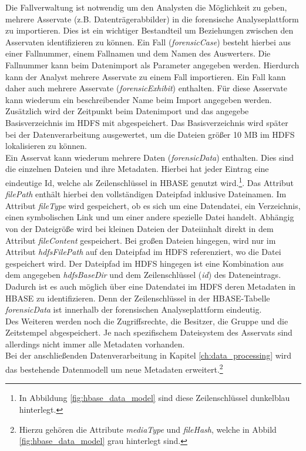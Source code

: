 \noindent
Die Fallverwaltung ist notwendig um den Analysten die Möglichkeit zu geben, mehrere Asservate (z.B. Datenträgerabbilder) in die forensische Analyseplattform zu importieren. Dies ist ein wichtiger Bestandteil um Beziehungen zwischen den Asservaten identifizieren zu können. Ein Fall (\textit{forensicCase}) besteht hierbei aus einer Fallnummer, einem Fallnamen und dem Namen des Auswerters. Die Fallnummer kann beim Datenimport als Parameter angegeben werden. Hierdurch kann der Analyst mehrere Asservate zu einem Fall importieren. Ein Fall kann daher auch mehrere Asservate (\textit{forensicExhibit}) enthalten. Für diese Asservate kann wiederum ein beschreibender Name beim Import angegeben werden. Zusätzlich wird der Zeitpunkt beim Datenimport und das angegebe Basisverzeichnis im HDFS mit abgespeichert. Das Basisverzeichnis wird später bei der Datenverarbeitung ausgewertet, um die Dateien größer 10 MB im HDFS lokalisieren zu können.\\

\noindent
Ein Asservat kann wiederum mehrere Daten (\textit{forensicData}) enthalten. Dies sind die einzelnen Dateien und ihre Metadaten. Hierbei hat jeder Eintrag eine eindeutige Id, welche als Zeilenschlüssel in HBASE genutzt wird.\footnote{In Abbildung \ref{fig:hbase_data_model} sind diese Zeilenschlüssel dunkelblau hinterlegt.}. Das Attribut \textit{filePath} enthält hierbei den vollständigen Dateipfad inklusive Dateinamen. 
Im Attribut \textit{fileType} wird gespeichert, ob es sich um eine Datendatei, ein Verzeichnis, einen symbolischen Link und um einer andere spezielle Datei handelt. Abhängig von der Dateigröße wird bei kleinen Dateien der Dateiinhalt direkt in dem Attribut \textit{fileContent} gespeichert. Bei großen Dateien hingegen, wird nur im Attribut \textit{hdfsFilePath} auf den Dateipfad im HDFS referenziert, wo die Datei gespeichert wird. Der Dateipfad im HDFS hingegen ist eine Kombination aus dem angegeben \textit{hdfsBaseDir} und dem Zeilenschlüssel (\textit{id}) des Dateneintrags. Dadurch ist es auch möglich über eine Datendatei im HDFS deren Metadaten in HBASE zu identifizieren. Denn der Zeilenschlüssel in der HBASE-Tabelle \textit{forensicData} ist innerhalb der forensischen Analyseplattform eindeutig.\\
Des Weiteren werden noch die Zugriffsrechte, die Besitzer, die Gruppe und die Zeitstempel abgespeichert. Je nach spezifischem Dateisystem des Asservats sind allerdings nicht immer alle Metadaten vorhanden.\\
Bei der anschließenden Datenverarbeitung in Kapitel \ref{ch:data_processing} wird das bestehende Datenmodell um neue Metadaten erweitert.\footnote{Hierzu gehören die Attribute \textit{mediaType} und \textit{fileHash}, welche in Abbild \ref{fig:hbase_data_model} grau hinterlegt sind.}

